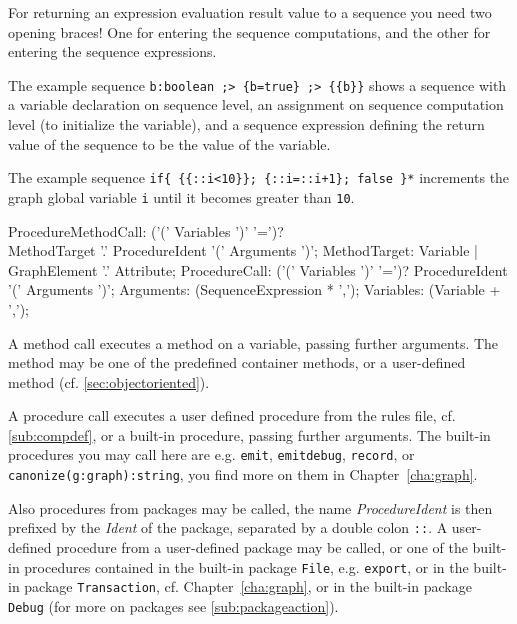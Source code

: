 \begin{note}
For returning an expression evaluation result value to a sequence you need two opening braces! 
One for entering the sequence computations, and the other for entering the sequence expressions.
\end{note}

\begin{example}
The example sequence
\verb#b:boolean ;> {b=true} ;> {{b}}#
shows a sequence with a variable declaration on sequence level, an assignment on sequence computation level (to initialize the variable), and a sequence expression defining the return value of the sequence to be the value of the variable.

The example sequence
\verb#if{ {{::i<10}}; {::i=::i+1}; false }*#
increments the graph global variable \texttt{i} until it becomes greater than \texttt{10}.
\end{example}

\begin{rail} 
	ProcedureMethodCall: ('(' Variables ')' '=')? \\ MethodTarget '.' ProcedureIdent '(' Arguments ')';
	MethodTarget: Variable | GraphElement '.' Attribute;
	ProcedureCall: ('(' Variables ')' '=')? ProcedureIdent '(' Arguments ')';
	Arguments: (SequenceExpression * ',');
	Variables: (Variable + ',');
\end{rail}

A method call executes a method on a variable, passing further arguments.
The method may be one of the predefined container methods, or a user-defined method (cf. \ref{sec:objectoriented}).

A procedure call executes a user defined procedure from the rules file, cf. \ref{sub:compdef},
or a built-in procedure, passing further arguments.
The built-in procedures you may call here are e.g. \texttt{emit}, \texttt{emitdebug}, \texttt{record}, or \texttt{canonize(g:graph):string}, you find more on them in Chapter~\ref{cha:graph}.

Also procedures from packages may be called, the name \emph{ProcedureIdent} is then prefixed by the \emph{Ident} of the package, separated by a double colon \texttt{::}.
A user-defined procedure from a user-defined package may be called, or one of the built-in procedures contained in the built-in package \texttt{File}, e.g. \texttt{export}, or in the  built-in package \texttt{Transaction}, cf. Chapter~\ref{cha:graph}, or in the built-in package \texttt{Debug} (for more on packages see \ref{sub:packageaction}).


